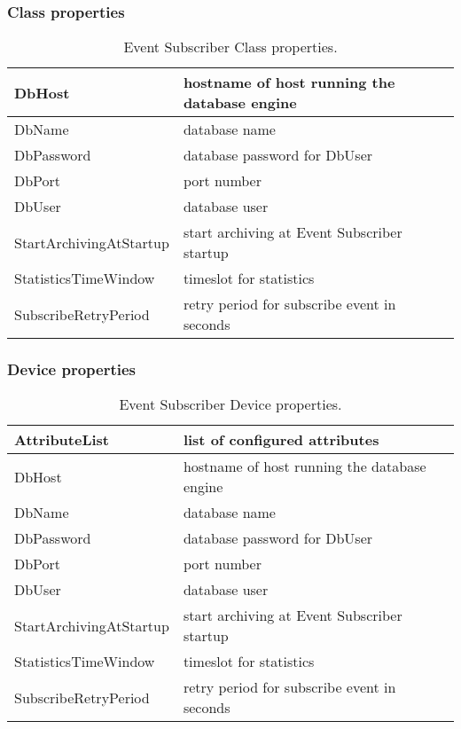 \documentclass[11pt,a4paper]{article}
\def \es{Event Subscriber}
\begin{document}
\subsubsection{Class properties}
\label{es:classprop}
\begin{table}[H]
	\begin{tabular}{p{}|p{}}
		\hline
		DbHost & hostname of host running the database engine \\
		\hline
		DbName & database name \\
		\hline
		DbPassword & database password for DbUser \\
		\hline
		DbPort & port number \\
		\hline
		DbUser & database user \\
		\hline
		StartArchivingAtStartup & start archiving at \es{} startup \\
		\hline
		StatisticsTimeWindow & timeslot for statistics \\
		\hline
		SubscribeRetryPeriod & retry period for subscribe event in seconds \\
		\hline
	\end{tabular}
	\caption{\es{} Class properties.}
	\label{es:classprop-table}
\end{table}

\subsubsection{Device properties}
\label{es:devprop}
\begin{table}[H]
	\begin{tabular}{p{}|p{}}
		\hline
		AttributeList & list of configured attributes \\
		\hline
		DbHost & hostname of host running the database engine \\
		\hline
		DbName & database name \\
		\hline
		DbPassword & database password for DbUser \\
		\hline
		DbPort & port number \\
		\hline
		DbUser & database user \\
		\hline
		StartArchivingAtStartup & start archiving at \es{} startup \\
		\hline
		StatisticsTimeWindow & timeslot for statistics \\
		\hline
		SubscribeRetryPeriod & retry period for subscribe event in seconds \\
		\hline
	\end{tabular}
	\caption{\es{} Device properties.}
	\label{es:devprop-table}
\end{table}
\end{document}
